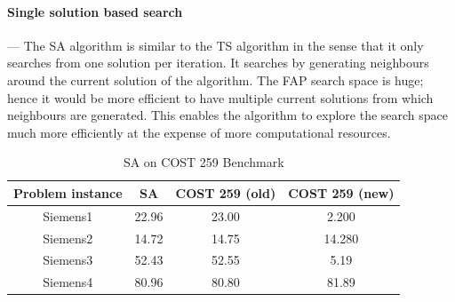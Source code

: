\paragraph{Single solution based search}
--- The SA algorithm is similar to the TS algorithm in the sense that it only searches from one solution per iteration. It searches by generating neighbours around the current solution of the algorithm. The FAP search space is huge; hence it would be more efficient to have multiple current solutions from which neighbours are generated. This enables the algorithm to explore the search space much more efficiently at the expense of more computational resources.
\begin{table}
\centering
	\begin{tabular}{| c | c | c | c |}
	\hline
	Problem instance & SA & COST 259 (old) & COST 259 (new) \\ \hline
	Siemens1 & 22.96 & 23.00 & 2.200\\ \hline
	Siemens2 & 14.72 & 14.75 & 14.280\\ \hline
	Siemens3 & 52.43 & 52.55 & 5.19\\ \hline
	Siemens4 & 80.96 & 80.80 & 81.89\\ \hline
	\end{tabular}
\caption{SA on COST 259 Benchmark}
\end{table}
